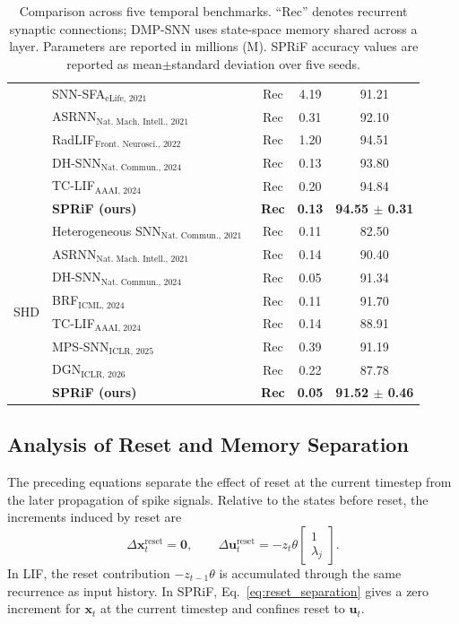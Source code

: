 \documentclass[letterpaper]{article} %
\begin{document}
\begin{table}[t]
\begin{tabular}{clccc}
& SNN-SFA$_{\text{eLife, 2021}}$~\cite{snnsfa} & Rec & 4.19 & 91.21 \\
& ASRNN$_{\text{Nat. Mach. Intell., 2021}}$~\cite{asrnn} & Rec & 0.31 & 92.10 \\
& RadLIF$_{\text{Front. Neurosci., 2022}}$~\cite{radlif} & Rec & 1.20 & 94.51 \\
& DH-SNN$_{\text{Nat. Commun., 2024}}$~\cite{dhsnn} & Rec & 0.13 & 93.80 \\
& TC-LIF$_{\text{AAAI, 2024}}$~\cite{tclif} & Rec & 0.20 & 94.84 \\
& \textbf{SPRiF (ours)} & \textbf{Rec} & \textbf{0.13} & \textbf{94.55 $\pm$ 0.31} \\
\midrule
\multirow{8}{*}{SHD}
& Heterogeneous SNN$_{\text{Nat. Commun., 2021}}$~\cite{heterogeneity} & Rec & 0.11 & 82.50 \\
& ASRNN$_{\text{Nat. Mach. Intell., 2021}}$~\cite{asrnn} & Rec & 0.14 & 90.40 \\
& DH-SNN$_{\text{Nat. Commun., 2024}}$~\cite{dhsnn} & Rec & 0.05 & 91.34 \\
& BRF$_{\text{ICML, 2024}}$~\cite{brf} & Rec & 0.11 & 91.70 \\
& TC-LIF$_{\text{AAAI, 2024}}$~\cite{tclif} & Rec & 0.14 & 88.91 \\
& MPS-SNN$_{\text{ICLR, 2025}}$~\cite{mpssnn} & Rec & 0.39 & 91.19 \\
& DGN$_{\text{ICLR, 2026}}$~\cite{dgn} & Rec & 0.22 & 87.78 \\
& \textbf{SPRiF (ours)} & \textbf{Rec} & \textbf{0.05} & \textbf{91.52 $\pm$ 0.46} \\
\bottomrule
\end{tabular}
\caption{Comparison across five temporal benchmarks. ``Rec'' denotes recurrent synaptic connections; DMP-SNN uses state-space memory shared across a layer. Parameters are reported in millions (M). SPRiF accuracy values are reported as mean$\pm$standard deviation over five seeds.}
\label{tab:main_results}
\end{table}

\subsection{Analysis of Reset and Memory Separation}

The preceding equations separate the effect of reset at the current timestep from the later propagation of spike signals. Relative to the states before reset, the increments induced by reset are
\begin{equation}
\Delta\mathbf{x}_t^{\mathrm{reset}}=\mathbf{0},\qquad
\Delta\mathbf{u}_t^{\mathrm{reset}}=-z_t\theta
\begin{bmatrix}1\\\lambda_j\end{bmatrix}.
\label{eq:reset_separation}
\end{equation}
In LIF, the reset contribution $-z_{t-1}\theta$ is accumulated through the same recurrence as input history. In SPRiF, Eq.~\eqref{eq:reset_separation} gives a zero increment for $\mathbf{x}_t$ at the current timestep and confines reset to $\mathbf{u}_t$.
\end{document}

